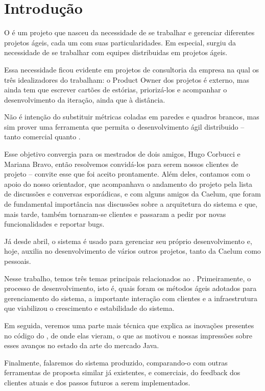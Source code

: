 \section{Introdução}
O \calopsita é um projeto que nasceu da necessidade de se trabalhar e gerenciar diferentes projetos ágeis, cada um com suas particularidades. Em especial, surgiu da necessidade de se trabalhar com equipes distribuidas em projetos ágeis. 

Essa necessidade ficou evidente em projetos de consultoria da empresa na qual os três idealizadores do \calopsita trabalham: o Product Owner dos projetos é externo, mas ainda tem que escrever cartões de estórias, priorizá-los e acompanhar o desenvolvimento da iteração, ainda que à distância.

Não é intenção do \calopsita substituir métricas coladas em paredes e quadros brancos, mas sim prover uma ferramenta que permita o desenvolvimento ágil distribuido -- tanto comercial quanto \opensource.  

Esse objetivo convergia para os mestrados de dois amigos, Hugo Corbucci e Mariana Bravo, então resolvemos convidá-los para serem nossos clientes de projeto -- convite esse que foi aceito prontamente. Além deles, contamos com o apoio do nosso orientador, que acompanhava o andamento do projeto pela lista de discussões e conversas esporádicas, e com alguns amigos da Caelum, que foram de fundamental importância nas discussões sobre a arquitetura do sistema e que, mais tarde, também tornaram-se clientes e passaram a pedir por novas funcionalidades e reportar bugs. 

Já desde abril, o sistema é usado para gerenciar seu próprio desenvolvimento e, hoje, auxilia no desenvolvimento de vários outros projetos, tanto da Caelum como pessoais.

Nesse trabalho, temos três temas principais relacionados ao \calopsita. Primeiramente, o processo de desenvolvimento, isto é, quais foram os métodos ágeis adotados para gerenciamento do sistema, a importante interação com clientes e a infraestrutura que viabilizou o crescimento e estabilidade do sistema. 

Em seguida, veremos uma parte mais técnica que explica as inovações presentes no código do \calopsita, de onde elas vieram, o que as motivou e nossas impressões sobre esses avanços no estado da arte do mercado Java.

Finalmente, falaremos do sistema produzido, comparando-o com outras ferramentas de proposta similar já existentes, \opensource e comerciais, do feedback dos clientes atuais e dos passos futuros a serem implementados.
